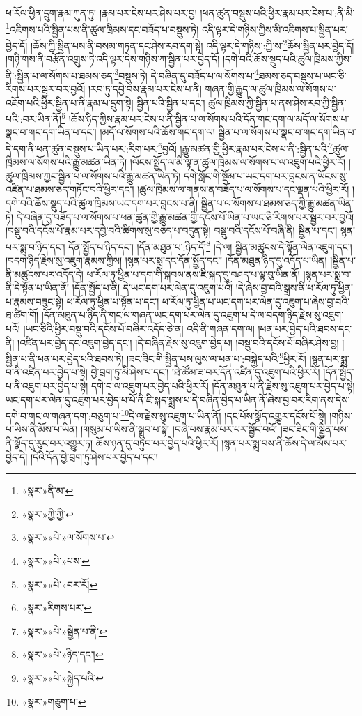 ཕ་རོལ་ཕྱིན་དྲུག་རྣམ་ཀུན་ཏུ། །རྣམ་པར་ངེས་པར་ཤེས་པར་བྱ། །ཕན་ཚུན་བསྡུས་པའི་ཕྱིར་རྣམ་པར་ངེས་པ་:ནི་མི་\footnote{«སྣར་»ནི་མ་}འཇིགས་པའི་སྦྱིན་པས་ནི་ཚུལ་ཁྲིམས་དང་བཟོད་པ་བསྡུས་ཏེ། འདི་ལྟར་དེ་གཉིས་ཀྱིས་མི་འཇིགས་པ་སྦྱིན་པར་བྱེད་དོ། །ཆོས་ཀྱི་སྦྱིན་པས་ནི་བསམ་གཏན་དང་ཤེས་རབ་དག་སྟེ། འདི་ལྟར་དེ་གཉིས་:ཀྱི་ས་\footnote{«སྣར་»ཀྱི་ཀྱི་}ཆོས་སྦྱིན་པར་བྱེད་དོ། །གཉི་གས་ནི་བརྩོན་འགྲུས་ཏེ་འདི་ལྟར་དེས་གཉིས་ཀ་སྦྱིན་པར་བྱེད་དོ། །དགེ་བའི་ཆོས་སྡུད་པའི་ཚུལ་ཁྲིམས་ཀྱིས་ནི་:སྦྱིན་པ་ལ་སོགས་པ་ཐམས་ཅད་\footnote{«སྣར་»«པེ་»ལ་སོགས་པ་}བསྡུས་ཏེ། དེ་བཞིན་དུ་བཟོད་པ་ལ་སོགས་པ་\footnote{«སྣར་»«པེ་»པས་}ཐམས་ཅད་བསྡུས་པ་ཡང་ཅི་རིགས་པར་སྦྱར་བར་བྱའོ། །རབ་ཏུ་དབྱེ་བས་རྣམ་པར་ངེས་པ་ནི། གཞན་གྱི་རྒྱུད་ལ་ཚུལ་ཁྲིམས་ལ་སོགས་པ་འཇོག་པའི་ཕྱིར་སྦྱིན་པ་ནི་རྣམ་པ་དྲུག་སྟེ། སྦྱིན་པའི་སྦྱིན་པ་དང་། ཚུལ་ཁྲིམས་ཀྱི་སྦྱིན་པ་ནས་ཤེས་རབ་ཀྱི་སྦྱིན་པའི་:བར་ཡིན་ནོ།\footnote{«སྣར་»«པེ་»བར་རོ།} །ཆོས་ཉིད་ཀྱིས་རྣམ་པར་ངེས་པ་ནི་སྦྱིན་པ་ལ་སོགས་པའི་དོན་གང་དག་ལ་མདོ་ལ་སོགས་པ་སྣང་བ་གང་དག་ཡིན་པ་དང་། །མདོ་ལ་སོགས་པའི་ཆོས་གང་དག་ལ། སྦྱིན་པ་ལ་སོགས་པ་སྣང་བ་གང་དག་ཡིན་པ་དེ་དག་ནི་ཕན་ཚུན་བསྡུས་པ་ཡིན་པར་:རིག་པར་\footnote{«སྣར་»རིགས་པར་}བྱའོ། །རྒྱུ་མཚན་གྱི་ཕྱིར་རྣམ་པར་ངེས་པ་ནི་:སྦྱིན་པའི་\footnote{«སྣར་»«པེ་»སྦྱིན་པ་ནི་}ཚུལ་ཁྲིམས་ལ་སོགས་པའི་རྒྱུ་མཚན་ཡིན་ཏེ། །ལོངས་སྤྱོད་ལ་མི་ལྟ་ན་ཚུལ་ཁྲིམས་ལ་སོགས་པ་ལ་འཇུག་པའི་ཕྱིར་རོ། །ཚུལ་ཁྲིམས་ཀྱང་སྦྱིན་པ་ལ་སོགས་པའི་རྒྱུ་མཚན་ཡིན་ཏེ། དགེ་སློང་གི་སྡོམ་པ་ཡང་དག་པར་བླངས་ན་ཡོངས་སུ་འཛིན་པ་ཐམས་ཅད་གཏོང་བའི་ཕྱིར་དང་། །ཚུལ་ཁྲིམས་ལ་གནས་ན་བཟོད་པ་ལ་སོགས་པ་དང་ལྡན་པའི་ཕྱིར་རོ། །དགེ་བའི་ཆོས་སྡུད་པའི་ཚུལ་ཁྲིམས་ཡང་དག་པར་བླངས་པ་ནི། སྦྱིན་པ་ལ་སོགས་པ་ཐམས་ཅད་ཀྱི་རྒྱུ་མཚན་ཡིན་ཏེ། དེ་བཞིན་དུ་བཟོད་པ་ལ་སོགས་པ་ཕན་ཚུན་གྱི་རྒྱུ་མཚན་གྱི་དངོས་པོ་ཡིན་པ་ཡང་ཅི་རིགས་པར་སྦྱར་བར་བྱའོ། །བསྡུ་བའི་དངོས་པོ་རྣམ་པར་དབྱེ་བའི་ཚིགས་སུ་བཅད་པ་བདུན་སྟེ། བསྡུ་བའི་དངོས་པོ་བཞི་ནི། སྦྱིན་པ་དང་། སྙན་པར་སྨྲ་བ་ཉིད་དང་། དོན་སྤྱོད་པ་ཉིད་དང་། །དོན་མཐུན་པ་:ཉིད་དོ།\footnote{«སྣར་»«པེ་»ཉིད་དང་།} །དེ་ལ། སྦྱིན་མཚུངས་དེ་སྟོན་ལེན་འཇུག་དང་། །བདག་ཉིད་རྗེས་སུ་འཇུག་རྣམས་ཀྱིས། །སྙན་པར་སྨྲ་དང་དོན་སྤྱོད་དང་། །དོན་མཐུན་ཉིད་དུ་འདོད་པ་ཡིན། །སྦྱིན་པ་ནི་མཚུངས་པར་འདོད་དེ། ཕ་རོལ་ཏུ་ཕྱིན་པ་དག་གི་སྐབས་ནས་ཇི་སྐད་དུ་བཤད་པ་ལྟ་བུ་ཡིན་ནོ། །སྙན་པར་སྨྲ་བ་ནི་དེ་སྟོན་པ་ཡིན་ནོ། །དོན་སྤྱོད་པ་ནི། དེ་ཡང་དག་པར་ལེན་དུ་འཇུག་པའོ། །དེ་ཞེས་བྱ་བའི་སྒྲས་ནི་ཕ་རོལ་ཏུ་ཕྱིན་པ་རྣམས་བཟུང་སྟེ། ཕ་རོལ་ཏུ་ཕྱིན་པ་སྟོན་པ་དང་། ཕ་རོལ་ཏུ་ཕྱིན་པ་ཡང་དག་པར་ལེན་དུ་འཇུག་པ་ཞེས་བྱ་བའི་ཐ་ཚིག་གོ། །དོན་མཐུན་པ་ཉིད་ནི་གང་ལ་གཞན་ཡང་དག་པར་ལེན་དུ་འཇུག་པ་དེ་ལ་བདག་ཉིད་རྗེས་སུ་འཇུག་པའོ། །ཡང་ཅིའི་ཕྱིར་བསྡུ་བའི་དངོས་པོ་བཞིར་འདོད་ཅེ་ན། འདི་ནི་གཞན་དག་ལ། །ཕན་པར་བྱེད་པའི་ཐབས་དང་ནི། །འཛིན་པར་བྱེད་དང་འཇུག་བྱེད་དང་། །དེ་བཞིན་རྗེས་སུ་འཇུག་བྱེད་པ། །བསྡུ་བའི་དངོས་པོ་བཞིར་ཤེས་བྱ། །སྦྱིན་པ་ནི་ཕན་པར་བྱེད་པའི་ཐབས་ཏེ། །ཟང་ཟིང་གི་སྦྱིན་པས་ལུས་ལ་ཕན་པ་:བསྐྱེད་པའི་\footnote{«སྣར་»«པེ་»སྐྱེད་པའི་}ཕྱིར་རོ། །སྙན་པར་སྨྲ་བ་ནི་འཛིན་པར་བྱེད་པ་སྟེ། བྱེ་བྲག་ཏུ་མི་ཤེས་པ་དང་། །ཐེ་ཚོམ་ཟ་བར་དོན་འཛིན་དུ་འཇུག་པའི་ཕྱིར་རོ། །དོན་སྤྱོད་པ་ནི་འཇུག་པར་བྱེད་པ་སྟེ། དགེ་བ་ལ་འཇུག་པར་བྱེད་པའི་ཕྱིར་རོ། །དོན་མཐུན་པ་ནི་རྗེས་སུ་འཇུག་པར་བྱེད་པ་སྟེ། ཡང་དག་པར་ལེན་དུ་འཇུག་པར་བྱེད་པ་པོ་ནི་ཇི་སྐད་སྨྲས་པ་དེ་བཞིན་བྱེད་པ་ཡིན་ནོ་ཞེས་བྱ་བར་རིག་ནས་དེས་དགེ་བ་གང་ལ་གཞན་དག་:བཅུག་པ་\footnote{«སྣར་»གཅུག་པ་}དེ་ལ་རྗེས་སུ་འཇུག་པ་ཡིན་ནོ། །དང་པོས་སྣོད་འགྱུར་དངོས་པོ་སྟེ། །གཉིས་པ་ཡིས་ནི་མོས་པ་ཡིན། །གསུམ་པ་ཡིས་ནི་སྒྲུབ་པ་སྟེ། །བཞི་པས་རྣམ་པར་པར་སྦྱོང་བའོ། །ཟང་ཟིང་གི་སྦྱིན་པས་ནི་སྣོད་དུ་རུང་བར་འགྱུར་ཏ། ཆོས་ཉན་དུ་བཏུབ་པར་བྱེད་པའི་ཕྱིར་རོ། །སྙན་པར་སྨྲ་བས་ནི་ཆོས་དེ་ལ་མོས་པར་བྱེད་དེ། །དེའི་དོན་བྱེ་བྲག་ཏུ་ཤེས་པར་བྱེད་པ་དང་། 